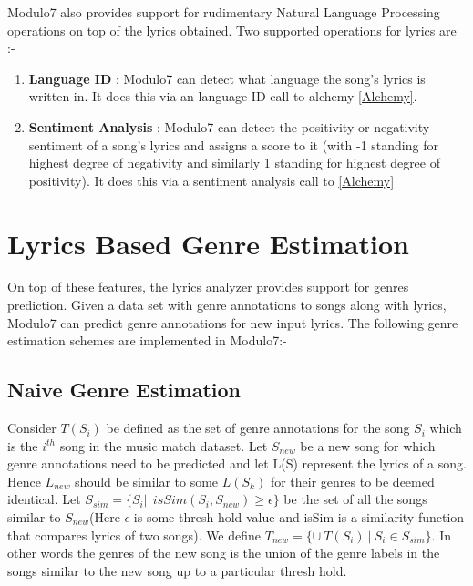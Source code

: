 \noindent Modulo7 also provides support for rudimentary Natural Language Processing operations on top of the lyrics obtained. Two supported operations for lyrics are :-

\begin{enumerate}
\item \textbf{Language ID} : Modulo7 can detect what language the song's lyrics is written in. It does this via an language ID call to alchemy \ref{Alchemy}. 
\item \textbf{Sentiment Analysis} : Modulo7 can detect the positivity or negativity sentiment of a song's lyrics and assigns a score to it (with -1 standing for highest degree of negativity and similarly 1 standing for highest degree of positivity). It does this via a sentiment analysis call to \ref{Alchemy}
\end{enumerate}

\section{Lyrics Based Genre Estimation} \label{genreestimation}

\noindent On top of these features, the lyrics analyzer provides support for genres prediction. Given a data set with genre annotations to songs along with lyrics, Modulo7 can predict genre annotations for new input lyrics. The following genre estimation schemes are implemented in Modulo7:-

\subsection{Naive Genre Estimation} \label{NaiveGenre}

\noindent Consider $T(S_i)$ be defined as the set of genre annotations for the song $S_i$ which is the $i^{th}$ song in the music match dataset. Let $S_{new}$ be a new song for which genre annotations need to be predicted and let L(S) represent the lyrics of a song. Hence $L_{new}$ should be similar to some $L(S_k)$ for their genres to be deemed identical. Let $S_{sim} = \{S_i | \ \ isSim(S_i, S_{new}) \geq \epsilon\} $ be the set of all the songs similar to $S_{new}$(Here $\epsilon$ is some thresh hold value and isSim is a similarity function that compares lyrics of two songs). We define $T_{new} = \{\cup \ T(S_i) \ | \ S_i \in S_{sim}\}$. In other words the genres of the new song is the union of the genre labels in the songs similar to the new song up to a particular thresh hold.

